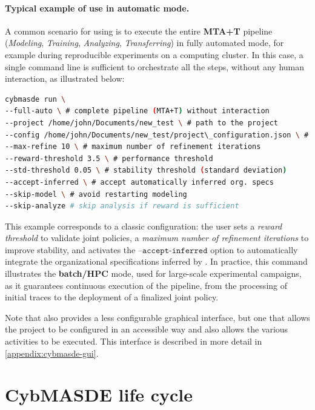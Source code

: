 \medskip
\noindent

\paragraph{Typical example of use in automatic mode.}
A common scenario for using  is to execute the entire \textbf{MTA+T} pipeline (\textit{Modeling}, \textit{Training}, \textit{Analyzing}, \textit{Transferring}) in fully automated mode, for example during reproducible experiments on a computing cluster.
In this case, a single command line is sufficient to orchestrate all the steps, without any human interaction, as illustrated below:

\begin{lstlisting}[language=bash, caption={Complete execution of CybMASDE in full-auto mode}, label={lst:cybmasde_full_auto}]
cybmasde run \
--full-auto \ # complete pipeline (MTA+T) without interaction
--project /home/john/Documents/new_test \ # path to the project
--config /home/john/Documents/new_test/project\_configuration.json \ # config file
--max-refine 10 \ # maximum number of refinement iterations
--reward-threshold 3.5 \ # performance threshold
--std-threshold 0.05 \ # stability threshold (standard deviation)
--accept-inferred \ # accept automatically inferred org. specs
--skip-model \ # avoid restarting modeling
--skip-analyze # skip analysis if reward is sufficient
\end{lstlisting}

This example corresponds to a classic configuration: the user sets a \textit{reward threshold} to validate joint policies, a \textit{maximum number of refinement iterations} to improve stability, and activates the $\texttt{--accept-inferred}$ option to automatically integrate the organizational specifications inferred by .
In practice, this command illustrates the \textbf{batch/HPC} mode, used for large-scale experimental campaigns, as it guarantees continuous execution of the pipeline, from the processing of initial traces to the deployment of a finalized joint policy.

Note that  also provides a less configurable graphical interface, but one that allows the project to be configured in an accessible way and also allows the various activities to be executed. This interface is described in more detail in \autoref{appendix:cybmasde-gui}.

\section{CybMASDE life cycle}

